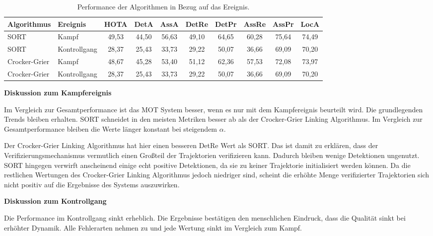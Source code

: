 \begin{table}[htbp]
\centering
\caption{Performance der Algorithmen in Bezug auf das Ereignis.}
\label{tab:HOTAübersEreig}
\begin{tabular}{
  l
  l
  S[table-format=2.2]
  S[table-format=2.2]
  S[table-format=2.2]
  S[table-format=2.2]
  S[table-format=2.2]
  S[table-format=2.2]
  S[table-format=2.2]
  S[table-format=2.2]
}
\toprule
{Algorithmus} & {Ereignis} & {HOTA} & {DetA} & {AssA} & {DetRe} & {DetPr} & {AssRe} & {AssPr} & {LocA} \\
\midrule
SORT          & Kampf      & 49,53 & 44,50 & 56,63 & 49,10  & 64,65  & 60,28  & 75,64  & 74,49 \\
SORT          & Kontrollgang & 28,37 & 25,43 & 33,73 & 29,22  & 50,07  & 36,66  & 69,09  & 70,20 \\
Crocker-Grier & Kampf      & 48,67 & 45,28 & 53,40 & 51,12  & 62,36  & 57,53  & 72,08  & 73,97 \\
Crocker-Grier & Kontrollgang & 28,37 & 25,43 & 33,73 & 29,22  & 50,07  & 36,66  & 69,09  & 70,20 \\
\bottomrule
\end{tabular}
\end{table}

\textbf{Diskussion zum Kampfereignis}\par
Im Vergleich zur Gesamtperformance ist das MOT System besser, wenn es nur mit dem Kampfereignis beurteilt wird. Die grundlegenden Trends bleiben erhalten. SORT schneidet in den meisten Metriken besser ab als der Crocker-Grier Linking Algorithmus. Im Vergleich zur Gesamtperformance bleiben die Werte länger konstant bei steigendem \(\alpha\). \par

Der Crocker-Grier Linking Algorithmus hat hier einen besseren DetRe Wert als SORT. Das ist damit zu erklären, dass der Verifizierungsmechanismus vermutlich einen Großteil der Trajektorien verifizieren kann. Dadurch bleiben wenige Detektionen ungenutzt. SORT hingegen verwirft anscheinend einige echt positive Detektionen, da sie zu keiner Trajektorie initialisiert werden können. Da die restlichen Wertungen des Crocker-Grier Linking Algorithmus jedoch niedriger sind, scheint die erhöhte Menge verifizierter Trajektorien sich nicht positiv auf die Ergebnisse des Systems auszuwirken.\dubpar  


\textbf{Diskussion zum Kontrollgang}\par
Die Performance im Kontrollgang sinkt erheblich. Die Ergebnisse bestätigen den menschlichen Eindruck, dass die Qualität sinkt bei erhöhter Dynamik. Alle Fehlerarten nehmen zu und jede Wertung sinkt im Vergleich zum Kampf. \par

